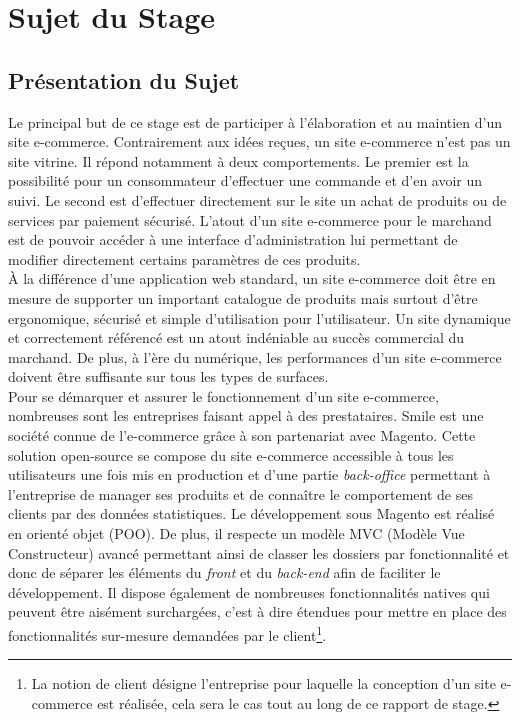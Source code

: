 \documentclass[12pt, a4paper, twoside]{report}
\begin{document}
\newpage\null\thispagestyle{empty}\newpage

\chapter{Sujet du Stage}

\section{Présentation du Sujet}

Le principal but de ce stage est de participer à l'élaboration et au maintien d'un site e-commerce. Contrairement aux idées reçues, un site e-commerce n'est pas un site vitrine. Il répond notamment à deux comportements. Le premier est la possibilité pour un consommateur d'effectuer une commande et d'en avoir un suivi. Le second est d'effectuer directement sur le site un achat de produits ou de services par paiement sécurisé. L'atout d'un site e-commerce pour le marchand est de pouvoir accéder à une interface d'administration lui permettant de modifier directement certains paramètres de ces produits. \\ 

À la différence d'une application web standard, un site e-commerce doit être en mesure de supporter un important catalogue de produits mais surtout d'être ergonomique, sécurisé et simple d'utilisation pour l'utilisateur. Un site dynamique et correctement référencé est un atout indéniable au succès commercial du marchand. De plus, à l'ère du numérique, les performances d'un site e-commerce doivent être suffisante sur tous les types de surfaces. \\

Pour se démarquer et assurer le fonctionnement d'un site e-commerce, nombreuses sont les entreprises faisant appel à des prestataires. Smile est une société connue de l'e-commerce grâce à son partenariat avec Magento. Cette solution open-source se compose du site e-commerce accessible à tous les utilisateurs une fois mis en production et d'une partie \textit{back-office} permettant à l'entreprise de manager ses produits et de connaître le comportement de ses clients par des données statistiques. Le développement sous Magento est réalisé en orienté objet (POO). De plus, il respecte un modèle MVC (Modèle Vue Constructeur) avancé permettant ainsi de classer les dossiers par fonctionnalité et donc de séparer les éléments du \textit{front} et du \textit{back-end} afin de faciliter le développement. Il dispose également de nombreuses fonctionnalités natives qui peuvent être aisément surchargées, c'est à dire étendues pour mettre en place des fonctionnalités sur-mesure demandées par le client\footnote{La notion de client désigne l'entreprise pour laquelle la conception d'un site e-commerce est réalisée, cela sera le cas tout au long de ce rapport de stage.}.
\end{document}
